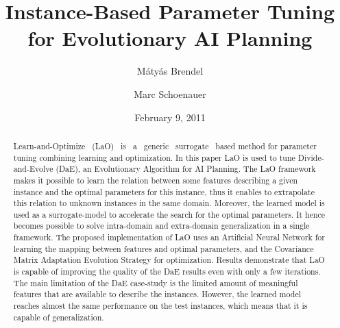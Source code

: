 \documentclass[runningheads,a4paper]{llncs}
\begin{document}
\title{Instance-Based Parameter Tuning\\
for Evolutionary AI Planning}

\author{ M{\'a}ty{\'a}s Brendel  \and Marc Schoenauer }





\date{February 9, 2011}
\maketitle
\begin{abstract}
Learn-and-Optimize ~(LaO) ~is ~a ~generic ~surrogate ~based method for parameter tuning combining learning and optimization. In this paper LaO is used to tune Divide-and-Evolve (DaE), an Evolutionary Algorithm for AI Planning. The LaO framework makes it possible to learn the relation between some features describing a given instance and the optimal parameters for this instance, thus it enables to extrapolate this relation to unknown instances in the same domain. Moreover, the learned model is used as a surrogate-model to accelerate the search for the optimal parameters. It hence becomes possible to solve intra-domain and extra-domain generalization in a single framework. The proposed implementation of LaO uses an Artificial Neural Network for learning the mapping between features and optimal parameters, and the Covariance Matrix Adaptation Evolution Strategy for optimization. Results demonstrate that LaO is capable of improving the quality of the DaE results even with only a few iterations. The main limitation of the DaE case-study is the limited amount of meaningful features that are available to describe the instances. However, the learned model reaches almost the same performance on the test instances, which means that it is capable of generalization. 

\end{abstract}
\end{document}
